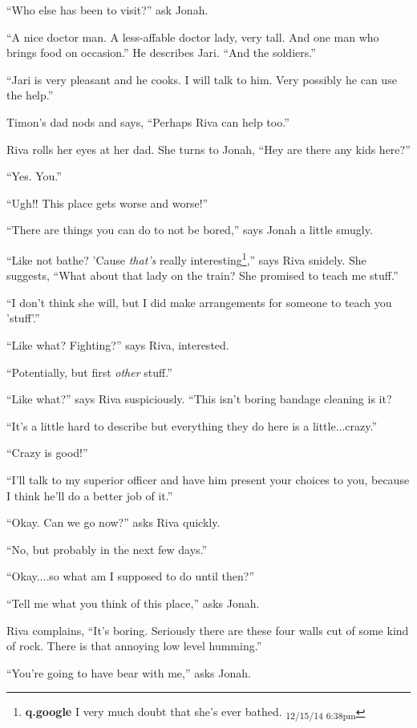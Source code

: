 ``Who else has been to visit?'' ask Jonah.

``A nice doctor man.  A less-affable doctor lady, very tall.  And one man who brings food on occasion.''  He describes Jari. ``And the soldiers.''

``Jari is very pleasant and he cooks.  I will talk to him.  Very possibly he can use the help.''

Timon's dad nods and says, ``Perhaps Riva can help too.''

Riva rolls her eyes at her dad.  She turns to Jonah, ``Hey are there any kids here?''

``Yes.  You.''

``Ugh!!  This place gets worse and worse!''

``There are things you can do to not be bored,'' says Jonah a little smugly.

``Like not bathe?  'Cause \textit{that's} really interesting\footnote{\textbf{q.google }I very much doubt that she's ever bathed. \textsubscript{12/15/14 6:38pm}},'' says Riva snidely.  She suggests, ``What about that lady on the train? She promised to teach me stuff.''

``I don't think she will, but I did make arrangements for someone to teach you 'stuff'.''

``Like what?  Fighting?'' says Riva, interested.

``Potentially, but first \textit{other} stuff.''

``Like what?'' says Riva suspiciously.  ``This isn't boring bandage cleaning is it?

``It's a little hard to describe but everything they do here is a little...crazy.''

``Crazy is good!''

``I'll talk to my superior officer and have him present your choices to you, because I think he'll do a better job of it.''

``Okay.  Can we go now?'' asks Riva quickly.

``No, but probably in the next few days.''

``Okay....so what am I supposed to do until then?''

``Tell me what you think of this place,'' asks Jonah.

Riva complains, ``It's boring.  Seriously there are these four walls cut of some kind of rock. There is that annoying low level humming.''

``You're going to have bear with me,'' asks Jonah.

